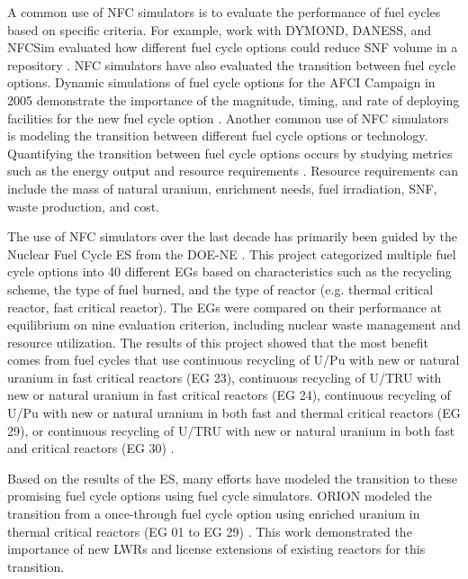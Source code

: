 A common use of \gls{NFC} simulators is to evaluate the performance 
of fuel cycles based on specific criteria. 
For example, work with \gls{DYMOND}, \gls{DANESS}, 
and \gls{NFCSim} evaluated how different fuel cycle options 
could reduce \gls{SNF} volume in a repository \cite{yacout_dynamic_2004}. 
\gls{NFC} simulators have also evaluated the transition between fuel cycle 
options. Dynamic simulations of fuel cycle options for the \gls{AFCI}
Campaign in 2005 demonstrate the importance of the magnitude, timing, 
and rate of deploying facilities for the new fuel cycle option 
\cite{piet_assessment_2011}.
Another common use of \gls{NFC} simulators is modeling the transition 
between 
different fuel cycle options or technology. Quantifying the transition 
between fuel cycle options occurs by studying metrics such as the 
energy output and resource requirements \cite{del_cul_advanced_2010}. 
Resource requirements can include the mass of natural uranium, enrichment 
needs, fuel irradiation, \gls{SNF}, waste production, and cost. 

The use of \gls{NFC} simulators over the 
last decade has primarily been guided by the Nuclear Fuel Cycle \gls{ES} 
from the \gls{DOE-NE} 
\cite{wigeland_nuclear_2014}. This project categorized 
multiple fuel cycle options into 40 different \glspl{EG} based on characteristics 
such as the recycling scheme, the type of fuel burned, 
and the type of reactor (e.g. thermal critical reactor, fast critical reactor). 
The \glspl{EG} were compared on their performance at equilibrium on nine evaluation 
criterion, including nuclear waste management and resource utilization. The 
results of this project showed that the most benefit comes from fuel cycles 
that use continuous recycling of U/Pu with new or natural uranium in fast critical 
reactors (\gls{EG} 23), continuous recycling of U/\gls{TRU} with new or natural 
uranium in fast critical reactors (\gls{EG} 24), continuous recycling of U/Pu 
with new or natural uranium in both fast and thermal critical reactors 
(\gls{EG} 29), or continuous recycling of U/\gls{TRU} with new or natural uranium in 
both fast and critical reactors (\gls{EG} 30) \cite{wigeland_nuclear_2014}. 

Based on the results of the \gls{ES}, many efforts have modeled 
the transition to these promising fuel cycle options using fuel cycle 
simulators. ORION modeled the transition from a once-through 
fuel cycle option using enriched uranium in thermal critical reactors 
(\gls{EG} 01 to \gls{EG} 29) \cite{sunny_transition_2015}. This work 
demonstrated the importance of new \glspl{LWR} and license 
extensions of existing reactors for this transition. 

